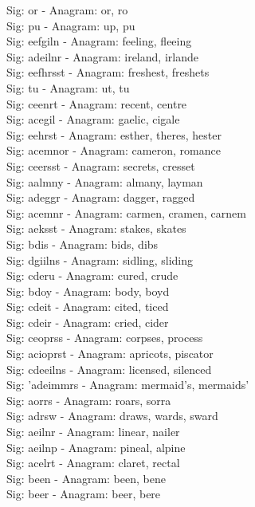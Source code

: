 Sig: {or} - Anagram: or, ro \\
Sig: {pu} - Anagram: up, pu \\
Sig: {eefgiln} - Anagram: feeling, fleeing \\
Sig: {adeilnr} - Anagram: ireland, irlande \\
Sig: {eefhrsst} - Anagram: freshest, freshets \\
Sig: {tu} - Anagram: ut, tu \\
Sig: {ceenrt} - Anagram: recent, centre \\
Sig: {acegil} - Anagram: gaelic, cigale \\
Sig: {eehrst} - Anagram: esther, theres, hester \\
Sig: {acemnor} - Anagram: cameron, romance \\
Sig: {ceersst} - Anagram: secrets, cresset \\
Sig: {aalmny} - Anagram: almany, layman \\
Sig: {adeggr} - Anagram: dagger, ragged \\
Sig: {acemnr} - Anagram: carmen, cramen, carnem \\
Sig: {aeksst} - Anagram: stakes, skates \\
Sig: {bdis} - Anagram: bids, dibs \\
Sig: {dgiilns} - Anagram: sidling, sliding \\
Sig: {cderu} - Anagram: cured, crude \\
Sig: {bdoy} - Anagram: body, boyd \\
Sig: {cdeit} - Anagram: cited, ticed \\
Sig: {cdeir} - Anagram: cried, cider \\
Sig: {ceoprss} - Anagram: corpses, process \\
Sig: {acioprst} - Anagram: apricots, piscator \\
Sig: {cdeeilns} - Anagram: licensed, silenced \\
Sig: {'adeimmrs} - Anagram: mermaid's, mermaids' \\
Sig: {aorrs} - Anagram: roars, sorra \\
Sig: {adrsw} - Anagram: draws, wards, sward \\
Sig: {aeilnr} - Anagram: linear, nailer \\
Sig: {aeilnp} - Anagram: pineal, alpine \\
Sig: {acelrt} - Anagram: claret, rectal \\
Sig: {been} - Anagram: been, bene \\
Sig: {beer} - Anagram: beer, bere \\
